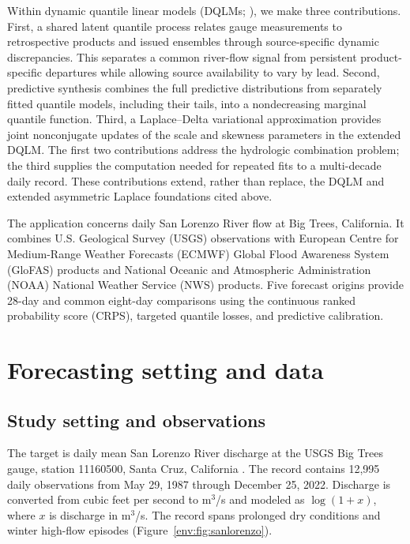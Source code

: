 Within dynamic quantile linear models (DQLMs;
\citealp{env-gourieroux2008dqlm,env-goncalves,exd-me}), we make three
contributions. First, a shared latent quantile process relates gauge
measurements to retrospective products and issued ensembles through
source-specific dynamic discrepancies. This separates a common river-flow
signal from persistent product-specific departures while allowing source
availability to vary by lead. Second, predictive synthesis combines the full
predictive distributions from separately fitted quantile models, including
their tails, into a nondecreasing marginal quantile function. Third, a
Laplace--Delta variational approximation provides joint nonconjugate updates
of the scale and skewness parameters in the extended DQLM. The first two
contributions address the hydrologic combination problem; the third supplies
the computation needed for repeated fits to a multi-decade daily record.
These contributions extend, rather than replace, the DQLM and extended
asymmetric Laplace foundations cited above.

The application concerns daily San Lorenzo River flow at Big Trees,
California. It combines U.S. Geological Survey (USGS) observations with
European Centre for Medium-Range Weather Forecasts (ECMWF) Global Flood
Awareness System (GloFAS) products and National Oceanic and Atmospheric
Administration (NOAA) National Weather Service (NWS) products. Five forecast
origins provide 28-day and common eight-day comparisons using the continuous
ranked probability score (CRPS), targeted quantile losses, and predictive
calibration.

\section{Forecasting setting and data}
\label{env:sec:data}

\subsection{Study setting and observations}

The target is daily mean San Lorenzo River discharge at the USGS Big Trees
gauge, station 11160500, Santa Cruz, California
\citep{env-usgs_daily_11160500}. The record contains 12,995 daily observations
from May 29, 1987 through December 25, 2022. Discharge is converted from cubic
feet per second to m$^3$/s and modeled as $\log(1+x)$, where $x$ is discharge
in m$^3$/s. The record spans prolonged dry conditions and winter high-flow
episodes (Figure~\ref{env:fig:sanlorenzo}).

